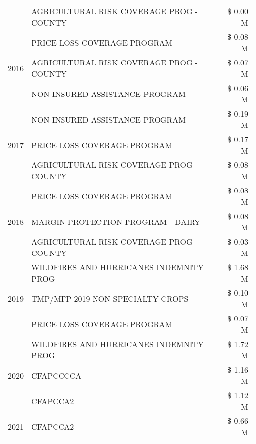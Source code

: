 \begin{tabular}{llr}
 & AGRICULTURAL RISK COVERAGE PROG - COUNTY & \$ 0.00 M \\
\cline{1-3}
\multirow[t]{3}{*}{2016} & PRICE LOSS COVERAGE PROGRAM & \$ 0.08 M \\
 & AGRICULTURAL RISK COVERAGE PROG - COUNTY & \$ 0.07 M \\
 & NON-INSURED ASSISTANCE PROGRAM & \$ 0.06 M \\
\cline{1-3}
\multirow[t]{3}{*}{2017} & NON-INSURED ASSISTANCE PROGRAM & \$ 0.19 M \\
 & PRICE LOSS COVERAGE PROGRAM & \$ 0.17 M \\
 & AGRICULTURAL RISK COVERAGE PROG - COUNTY & \$ 0.08 M \\
\cline{1-3}
\multirow[t]{3}{*}{2018} & PRICE LOSS COVERAGE PROGRAM & \$ 0.08 M \\
 & MARGIN PROTECTION PROGRAM - DAIRY & \$ 0.08 M \\
 & AGRICULTURAL RISK COVERAGE PROG - COUNTY & \$ 0.03 M \\
\cline{1-3}
\multirow[t]{3}{*}{2019} & WILDFIRES AND HURRICANES INDEMNITY PROG & \$ 1.68 M \\
 & TMP/MFP 2019 NON SPECIALTY CROPS & \$ 0.10 M \\
 & PRICE LOSS COVERAGE PROGRAM & \$ 0.07 M \\
\cline{1-3}
\multirow[t]{3}{*}{2020} & WILDFIRES AND HURRICANES INDEMNITY PROG & \$ 1.72 M \\
 & CFAPCCCCA & \$ 1.16 M \\
 & CFAPCCA2 & \$ 1.12 M \\
\cline{1-3}
2021 & CFAPCCA2 & \$ 0.66 M \\
\cline{1-3}
\bottomrule
\end{tabular}

